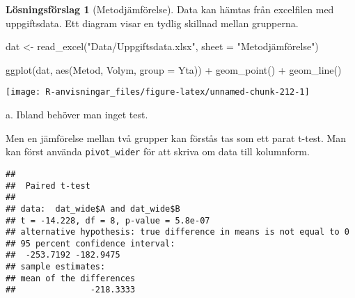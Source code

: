 \documentclass[
]{book}
\newenvironment{Shaded}{\begin{snugshade}}{\end{snugshade}}
\newcommand{\AttributeTok}[1]{\textcolor[rgb]{0.77,0.63,0.00}{#1}}
\newcommand{\FunctionTok}[1]{\textcolor[rgb]{0.00,0.00,0.00}{#1}}
\newcommand{\NormalTok}[1]{#1}
\newcommand{\OtherTok}[1]{\textcolor[rgb]{0.56,0.35,0.01}{#1}}
\newcommand{\SpecialCharTok}[1]{\textcolor[rgb]{0.00,0.00,0.00}{#1}}
\newcommand{\StringTok}[1]{\textcolor[rgb]{0.31,0.60,0.02}{#1}}
\theoremstyle{definition}
\theoremstyle{definition}
\theoremstyle{definition}
\theoremstyle{definition}
\newtheorem{hypothesis}{Lösningsförslag}[chapter]
\theoremstyle{remark}
\begin{document}
\begin{hypothesis}[Metodjämförelse]
Data kan hämtas från excelfilen med uppgiftsdata. Ett diagram visar en tydlig skillnad mellan grupperna.

\begin{Shaded}
\begin{Highlighting}[]
\NormalTok{dat }\OtherTok{\textless{}{-}} \FunctionTok{read\_excel}\NormalTok{(}\StringTok{"Data/Uppgiftsdata.xlsx"}\NormalTok{, }\AttributeTok{sheet =} \StringTok{"Metodjämförelse"}\NormalTok{)}

\FunctionTok{ggplot}\NormalTok{(dat, }\FunctionTok{aes}\NormalTok{(Metod, Volym, }\AttributeTok{group =}\NormalTok{ Yta)) }\SpecialCharTok{+}
  \FunctionTok{geom\_point}\NormalTok{() }\SpecialCharTok{+}
  \FunctionTok{geom\_line}\NormalTok{()}
\end{Highlighting}
\end{Shaded}

\begin{center}\texttt{[image: R-anvisningar\_files/figure-latex/unnamed-chunk-212-1]} \end{center}

a. Ibland behöver man inget test.

Men en jämförelse mellan två grupper kan förstås tas som ett parat t-test. Man kan först använda \texttt{pivot\_wider} för att skriva om data till kolumnform.

\begin{Shaded}
\end{Shaded}

\begin{verbatim}
## 
##  Paired t-test
## 
## data:  dat_wide$A and dat_wide$B
## t = -14.228, df = 8, p-value = 5.8e-07
## alternative hypothesis: true difference in means is not equal to 0
## 95 percent confidence interval:
##  -253.7192 -182.9475
## sample estimates:
## mean of the differences 
##               -218.3333
\end{verbatim}


\end{hypothesis}
\end{document}
